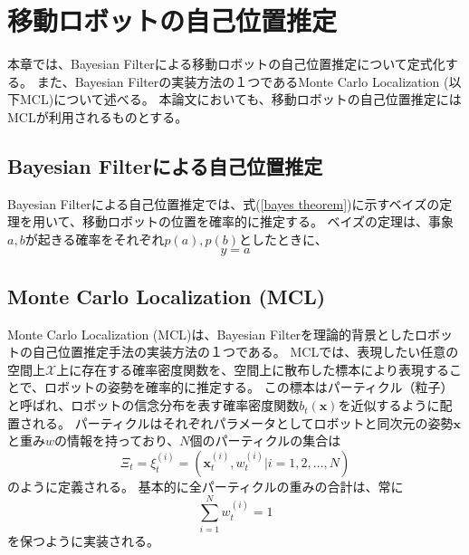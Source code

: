 \chapter{移動ロボットの自己位置推定} \label{chapter:localization}

本章では、Bayesian Filterによる移動ロボットの自己位置推定について定式化する。
また、Bayesian Filterの実装方法の１つであるMonte Carlo Localization (以下MCL)について述べる。
本論文においても、移動ロボットの自己位置推定にはMCLが利用されるものとする。



\section{Bayesian Filterによる自己位置推定}

Bayesian Filterによる自己位置推定では、式(\ref{bayes theorem})に示すベイズの定理を用いて、移動ロボットの位置を確率的に推定する。
ベイズの定理は、事象$a, b$が起きる確率をそれぞれ$p(a), p(b)$としたときに、
\begin{equation}
\label{bayes theorem}
  y = a
\end{equation}



\section{Monte Carlo Localization (MCL)}

Monte Carlo Localization (MCL)は、Bayesian Filterを理論的背景としたロボットの自己位置推定手法の実装方法の１つである。
MCLでは、表現したい任意の空間上$\mathcal{X}$上に存在する確率密度関数を、空間上に散布した標本により表現することで、ロボットの姿勢を確率的に推定する。
この標本はパーティクル（粒子）と呼ばれ、ロボットの信念分布を表す確率密度関数$b_t(\bm{x})$を近似するように配置される。
パーティクルはそれぞれパラメータとしてロボットと同次元の姿勢$\bm{x}$と重み$w$の情報を持っており、$N$個のパーティクルの集合は
\begin{equation}
\label{particles}
  \Xi_{t} = {\xi^{(i)}_{t} = (\bm{x}^{(i)}_{t}, w^{(i)}_{t} |i = 1,2,\dots,N) }
\end{equation}
のように定義される。
基本的に全パーティクルの重みの合計は、常に
\begin{equation}
\label{weight_sum}
  \sum_{i=1}^{N}w^{(i)}_{t}=1
\end{equation}
を保つように実装される。

